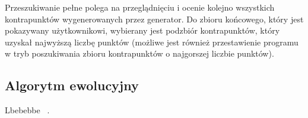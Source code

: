 \documentclass{article}
\begin{document}
Przeszukiwanie pełne polega na przeglądnięciu i ocenie kolejno wszystkich kontrapunktów wygenerowanych przez generator. Do zbioru końcowego, który jest pokazywany użytkownikowi, wybierany jest podzbiór kontrapunktów, który uzyskał najwyższą liczbę punktów (możliwe jest również przestawienie programu w tryb poszukiwania zbioru kontrapunktów o najgorszej liczbie punktów).

\subsection{Algorytm ewolucyjny}

Lbebebbe ~\cite{Gawlas}.




\end{document}
